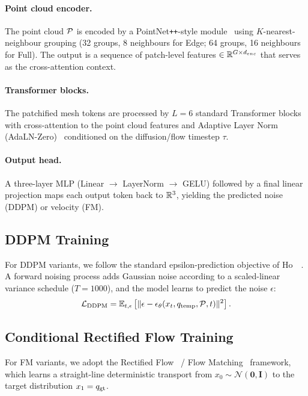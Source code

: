 \documentclass{article}
\begin{document}
\paragraph{Point cloud encoder.}
The point cloud $\mathcal{P}$ is encoded by a PointNet\texttt{++}-style module~\cite{qi2017pointnetpp} using $K$-nearest-neighbour grouping (32 groups, 8 neighbours for Edge; 64 groups, 16 neighbours for Full). The output is a sequence of patch-level features $\in \mathbb{R}^{G \times d_{enc}}$ that serves as the cross-attention context.

\paragraph{Transformer blocks.}
The patchified mesh tokens are processed by $L = 6$ standard Transformer blocks~\cite{vaswani2017attention} with cross-attention to the point cloud features and Adaptive Layer Norm (AdaLN-Zero)~\cite{ho2020ddpm} conditioned on the diffusion/flow timestep $\tau$.

\paragraph{Output head.}
A three-layer MLP (Linear $\to$ LayerNorm $\to$ GELU) followed by a final linear projection maps each output token back to $\mathbb{R}^3$, yielding the predicted noise (DDPM) or velocity (FM).

\subsection{DDPM Training}
\label{ssec:ddpm}

For DDPM variants, we follow the standard epsilon-prediction objective of Ho~\etal~\cite{ho2020ddpm}. A forward noising process adds Gaussian noise according to a scaled-linear variance schedule ($T=1000$), and the model learns to predict the noise $\epsilon$:
\begin{equation}
    \mathcal{L}_\text{DDPM} = \mathbb{E}_{t, \epsilon}\left[\|\epsilon - \epsilon_\theta(x_t, q_\mathrm{temp}, \mathcal{P}, t)\|^2\right].
    \label{eq:ddpm_loss}
\end{equation}

\subsection{Conditional Rectified Flow Training}
\label{ssec:fm}

For FM variants, we adopt the Rectified Flow~\cite{liu2023rectifiedflow} / Flow Matching~\cite{lipman2023flow} framework, which learns a straight-line deterministic transport from $x_0 \sim \mathcal{N}(\mathbf{0}, \mathbf{I})$ to the target distribution $x_1 = q_\mathrm{gt}$.
\end{document}
